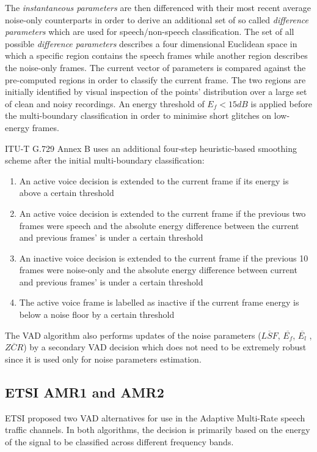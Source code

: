 The \emph{instantaneous parameters} are then differenced with their most recent average noise-only counterparts in order to derive an additional set of so called \emph{difference parameters} which are used for speech/non-speech classification. The set of all possible \emph{difference parameters} describes a four dimensional Euclidean space in which a specific region contains the speech frames while another region describes the noise-only frames. The current vector of parameters is compared against the pre-computed regions in order to classify the current frame. The two regions are initially identified by visual inspection of the points' distribution over a large set of clean and noisy recordings. An energy threshold of $E_f < 15 dB$ is applied before the multi-boundary classification in order to minimise short glitches on low-energy frames.

ITU-T G.729 Annex B uses an additional four-step heuristic-based smoothing scheme after the initial multi-boundary classification:
\begin{enumerate}
\item An active voice decision is extended to the current frame if its energy is above a certain threshold
\item An active voice decision is extended to the current frame if the previous two frames were speech and the absolute energy difference between the current and previous frames' is under a certain threshold
\item An inactive voice decision is extended to the current frame if the previous 10 frames were noise-only and the absolute energy difference between current and previous frames' is under a certain threshold
\item The active voice frame is labelled as inactive if the current frame energy is below a noise floor by a certain threshold
\end{enumerate}

The VAD algorithm also performs updates of the noise parameters ($\overline{LSF}$, $\overline{E_f}$, $\overline{E_l}$ , $\overline{ZCR}$) by a secondary VAD decision which does not need to be extremely robust since it is used only for noise parameters estimation.

\subsection{ETSI AMR1 and AMR2}

ETSI proposed two VAD alternatives for use in the Adaptive Multi-Rate speech traffic channels. In both algorithms, the decision is primarily based on the energy of the signal to be classified across different frequency bands.

